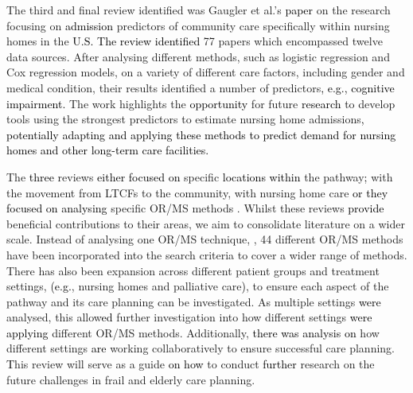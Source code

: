 \documentclass[../thesis.tex]{subfiles}
\begin{document}
The third and final review identified was Gaugler et al.'s \cite{Gaugler} \textcolor{black}{paper} on the research focusing on \textcolor{black}{admission} predictors of community care specifically within nursing homes in the \textcolor{black}{U.S.} \textcolor{black}{The review identified} 77 papers which encompassed twelve data sources. After analysing different methods, such as logistic regression and Cox regression models, on a variety of different care factors, including gender and medical condition, their results identified a number of predictors\textcolor{black}{, e.g., cognitive impairment.} The work highlights the \textcolor{black}{opportunity} for future \textcolor{black}{research} to develop tools using the strongest predictors to estimate nursing home admissions\textcolor{black}{, potentially adapting and applying these methods to predict demand for nursing homes and other long-term care facilities.}

The \textcolor{black}{three} reviews \textcolor{black}{either focused on} specific \textcolor{black}{locations within} the pathway\textcolor{black}{;} \cite{Freeman} with the movement from LTCFs to the community, \cite{Gaugler} with nursing home care \textcolor{black}{or they focused on analysing} specific OR/MS method\textcolor{black}{s \cite{Berntsen}}. Whilst these reviews \textcolor{black}{provide} beneficial contributions to their areas, we aim to consolidate literature on a wider scale. Instead of analysing one OR/MS technique, \cite{Berntsen}, 44 different OR/MS methods have been incorporated into the search criteria to cover a wider range of methods. There has also been expansion across different patient groups and treatment settings, \textcolor{black}{(e.g.}, nursing homes and palliative care\textcolor{black}{)}, to ensure each aspect of the pathway and its care planning can be investigated. As multiple settings \textcolor{black}{were} analysed, this allow\textcolor{black}{ed} further investigation into how different settings \textcolor{black}{were applying} different OR/MS methods. Additionally, \textcolor{black}{there was analysis on} how different settings \textcolor{black}{are} working collaboratively to ensure successful care planning. \textcolor{black}{T}his review will serve as a guide \textcolor{black}{on how} to conduct \textcolor{black}{further} research on the future challenges in frail and elderly care planning.  
\end{document}
